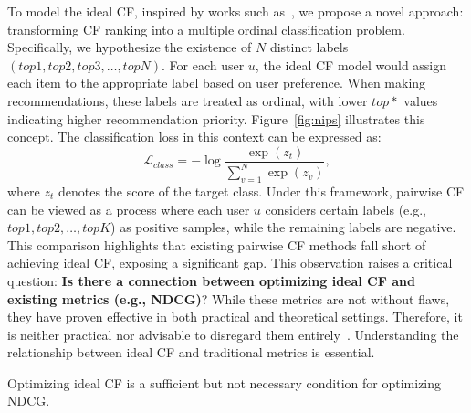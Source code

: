 To model the ideal CF, inspired by works such as~\cite{YK20,LWB07}, we propose a novel approach: transforming CF ranking into a multiple ordinal classification problem. Specifically, we hypothesize the existence of $N$ distinct labels $(top1, top2, top3, \ldots, topN)$. For each user $u$, the ideal CF model would assign each item to the appropriate label based on user preference. When making recommendations, these labels are treated as ordinal, with lower $top*$ values indicating higher recommendation priority. Figure~\ref{fig:nips} illustrates this concept. The classification loss in this context can be expressed as:
\begin{equation}
\mathcal{L}_{class} = -\log\frac{\exp(z_t)}{\sum_{v=1}^{N} \exp(z_v)},
\end{equation}
where $z_t$ denotes the score of the target class. Under this framework, pairwise CF can be viewed as a process where each user $u$ considers certain labels (e.g., $top1, top2, \ldots, topK$) as positive samples, while the remaining labels are negative. This comparison highlights that existing pairwise CF methods fall short of achieving ideal CF, exposing a significant gap. This observation raises a critical question: \textbf{Is there a connection between optimizing ideal CF and existing metrics (e.g., NDCG)}? While these metrics are not without flaws, they have proven effective in both practical and theoretical settings. Therefore, it is neither practical nor advisable to disregard them entirely~\cite{PCH24}. Understanding the relationship between ideal CF and traditional metrics is essential.
\begin{theorem}
\label{th:2}
Optimizing ideal CF is a sufficient but not necessary condition for optimizing NDCG.
\end{theorem}

